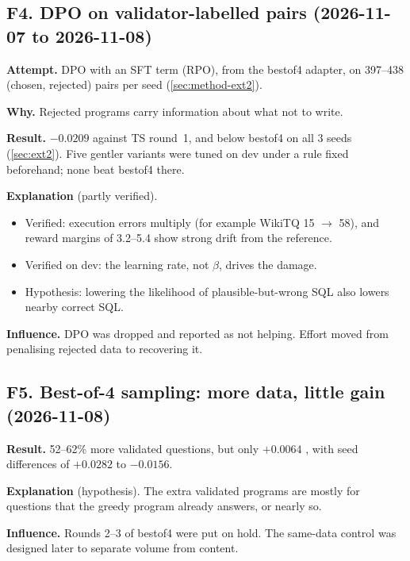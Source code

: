\subsection{F4. DPO on validator-labelled pairs (2026-11-07 to 2026-11-08)}
\begin{failbox}{}
\textbf{Attempt.} DPO with an SFT term (RPO), from the bestof4 adapter, on 397--438 (chosen, rejected) pairs per seed
(\cref{sec:method-ext2}).

\textbf{Why.} Rejected programs carry information about what not to write.

\textbf{Result.} $-0.0209$ against TS round~1, and below bestof4 on all 3 seeds (\cref{sec:ext2}). Five gentler variants
were tuned on dev under a rule fixed beforehand; none beat bestof4 there.

\textbf{Explanation} (partly verified).
\begin{itemize}
\item Verified: execution errors multiply (for example WikiTQ 15 $\to$ 58), and reward margins of 3.2--5.4 show strong
drift from the reference.
\item Verified on dev: the learning rate, not $\beta$, drives the damage.
\item Hypothesis: lowering the likelihood of plausible-but-wrong SQL also lowers nearby correct SQL.
\end{itemize}

\textbf{Influence.} DPO was dropped and reported as not helping. Effort moved from penalising rejected data to
recovering it.
\end{failbox}

\subsection{F5. Best-of-4 sampling: more data, little gain (2026-11-08)}
\begin{failbox}{}
\textbf{Result.} 52--62\% more validated questions, but only $+0.0064$ \Mviii{}, with seed differences of $+0.0282$
to $-0.0156$.

\textbf{Explanation} (hypothesis). The extra validated programs are mostly for questions that the greedy program
already answers, or nearly so.

\textbf{Influence.} Rounds 2--3 of bestof4 were put on hold. The same-data control was designed later to separate
volume from content.
\end{failbox}


